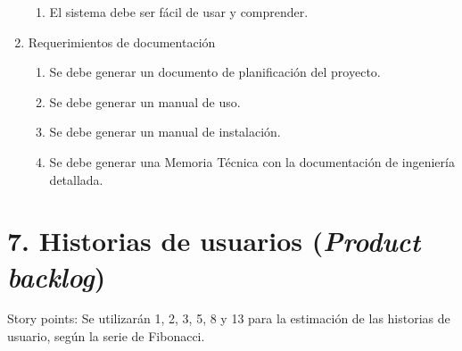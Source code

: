 \documentclass[
11pt, %
]{charter}
\begin{document}
\begin{enumerate}
\begin{enumerate}
			\item El sistema debe ser fácil de usar y comprender.
		\end{enumerate}	
	\item Requerimientos de documentación
		\begin{enumerate}
			\item Se debe generar un documento de planificación del proyecto.
			\item Se debe generar un manual de uso.
			\item Se debe generar un manual de instalación.
			\item Se debe generar una Memoria Técnica con la documentación de ingeniería detallada.			
		\end{enumerate}
\end{enumerate}

\section{7. Historias de usuarios (\textit{Product backlog})}
\label{sec:backlog}

Story points: Se utilizarán 1, 2, 3, 5, 8 y 13 para la estimación de las historias de usuario, según la
serie de Fibonacci.
\end{document}

